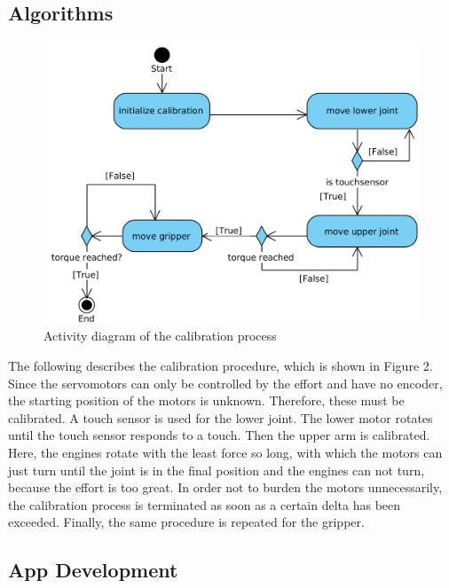 \documentclass[conference]{IEEEtran}
\begin{document}
\subsection{Algorithms}\label{sec:algorithms}
\begin{figure}[bt] 
	\centering
	\includegraphics[width=\textwidth/2]{img/calibration.png}
	\caption[caption]{Activity diagram of the calibration process}
\label{fig:calibration}
\end{figure}
The following describes the calibration procedure, which is shown in Figure 2. Since the servomotors can only be controlled by the effort and have no encoder, the starting position of the motors is unknown. Therefore, these must be calibrated. A touch sensor is used for the lower joint. The lower motor rotates until the touch sensor responds to a touch. Then the upper arm is calibrated. Here, the engines rotate with the least force so long, with which the motors can just turn until the joint is in the final position and the engines can not turn, because the effort is too great. In order not to burden the motors unnecessarily, the calibration process is terminated as soon as a certain delta has been exceeded. Finally, the same procedure is repeated for the gripper.

\subsection{App Development}\label{sec:development}
\end{document}

